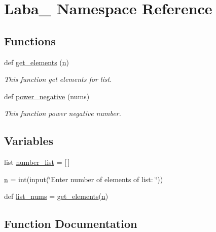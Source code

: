 \hypertarget{namespace_laba__3}{}\section{Laba\+\_ Namespace Reference}
\label{namespace_laba__3}
\subsection*{Functions}
\begin{DoxyCompactItemize}
\item 
def \hyperlink{namespace_laba__3_ac5fdf6855efe228c1c4fba42eec68566}{get\+\_\+elements} (\hyperlink{namespace_laba__3_a8c71cdbc127cf2626a591ca43743d078}{n})
\begin{DoxyCompactList}\small\item\em This function get elements for list. \end{DoxyCompactList}\item 
def \hyperlink{namespace_laba__3_abe3ae253298c87454a72df4f5faea91a}{power\+\_\+negative} (nums)
\begin{DoxyCompactList}\small\item\em This function power negative number. \end{DoxyCompactList}\end{DoxyCompactItemize}
\subsection*{Variables}
\begin{DoxyCompactItemize}
\item 
list \hyperlink{namespace_laba__3_ad9a6a68f2ad3c8eed66309eaf71309db}{number\+\_\+list} = \mbox{[}$\,$\mbox{]}
\item 
\hyperlink{namespace_laba__3_a8c71cdbc127cf2626a591ca43743d078}{n} = int(input(\char`\"{}Enter number of elements of list\+: \char`\"{}))
\item 
def \hyperlink{namespace_laba__3_a914f17bc7cc110fdd3477c9a86a1b41d}{list\+\_\+nums} = \hyperlink{namespace_laba__3_ac5fdf6855efe228c1c4fba42eec68566}{get\+\_\+elements}(\hyperlink{namespace_laba__3_a8c71cdbc127cf2626a591ca43743d078}{n})
\end{DoxyCompactItemize}


\subsection{Function Documentation}
\mbox{\label{namespace_laba__3_ac5fdf6855efe228c1c4fba42eec68566}} 

